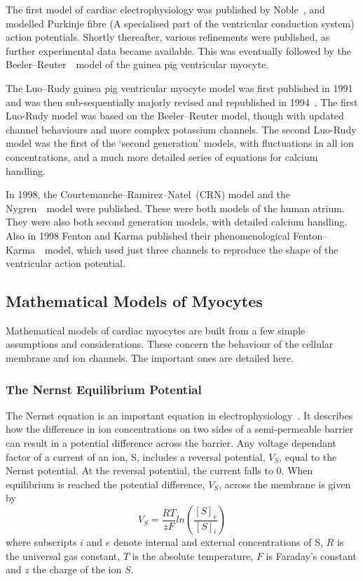 The first model of cardiac electrophysiology was published by
Noble~\cite{Noble1962}, and modelled Purkinje fibre (A specialised part of the
ventricular conduction system) action potentials.
Shortly thereafter, various refinements were published, as further experimental
data became available.
This was eventually followed by the Beeler--Reuter~\cite{Beeler1977}\ model of
the guinea pig ventricular myocyte.

The Luo--Rudy guinea pig ventricular myocyte model was first published in
1991~\cite{Luo1991} and was then sub-sequentially majorly revised and
republished in 1994~\cite{Luo1994}.
The first Luo-Rudy model was based on the Beeler--Reuter model, though with updated channel behaviours
and more complex potassium channels.
The second Luo-Rudy model was the first of the `second generation' models,
with fluctuations in all ion concentrations, and a much more detailed series of
equations for calcium handling.

In 1998, the Courtemanche--Ramirez--Natel\cite{CRN98}\ (CRN) model and the
Nygren~\cite{Nygren1998}\ model were published.
These were both models of the human atrium.
They were also both second generation models, with detailed calcium handling.
Also in 1998 Fenton and Karma published their phenomenological
Fenton--Karma~\cite{Fenton1998}\ model, which used just three channels to
reproduce the shape of the ventricular action potential.

\subsection{Mathematical Models of Myocytes}

Mathematical models of cardiac myocytes are built from a few simple assumptions
and considerations.
These concern the behaviour of the cellular membrane and ion channels.
The important ones are detailed here.

\subsubsection{The Nernst Equilibrium Potential}

The Nernst equation is an important equation in electrophysiology~\cite{Fall2002}.
It describes how the difference in ion concentrations on two sides of a
semi-permeable barrier can result in a potential difference across the barrier.
Any voltage dependant factor of a current of an ion, S, includes a reversal
potential, $V_{S}$, equal to the Nernst potential.
At the reversal potential, the current falls to 0.
When equilibrium is reached the potential difference, $V_{S}$, across the
membrane is given by
\begin{equation}
V_{S} = \frac{RT}{zF}ln\left( \frac{[S]_{e}}{[S]_{i}} \right) 
\end{equation} 
where subscripts $i$ and $e$ denote internal and external concentrations of S,
$R$ is the universal gas constant, $T$ is the absolute temperature, $F$ is
Faraday's constant and $z$ the charge of the ion $S$.

